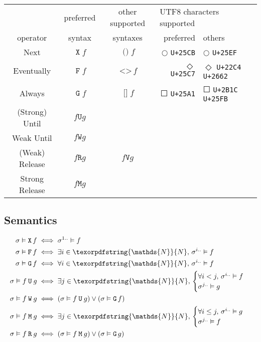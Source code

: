 \documentclass[a4paper,twoside,10pt,DIV=12]{scrreprt}
\newcommand{\uni}[1]{\texttt{\small U+#1}}
\newcommand{\N}{\texorpdfstring{\ensuremath{\mathds{N}}}{N}}
\DeclareMathOperator{\F}{\texttt{F}}
\DeclareMathOperator{\FALT}{\texttt{<>}}
\DeclareMathOperator{\G}{\texttt{G}}
\DeclareMathOperator{\GALT}{\texttt{[]}}
\newcommand{\U}{\mathbin{\texttt{U}}}
\newcommand{\R}{\mathbin{\texttt{R}}}
\newcommand{\RALT}{\mathbin{\texttt{V}}}
\DeclareMathOperator{\X}{\texttt{X}}
\DeclareMathOperator{\XALT}{\texttt{()}}
\newcommand{\M}{\mathbin{\texttt{M}}}
\newcommand{\W}{\mathbin{\texttt{W}}}
\newcommand{\0}{\texttt{0}}
\newcommand{\1}{\texttt{1}}
\begin{document}
\begin{center}
\begin{tabular}{cccrl}
                 & preferred & \multicolumn{1}{c}{other supported} & \multicolumn{2}{l}{UTF8 characters supported} \\
   operator      & syntax    & \multicolumn{1}{c}{syntaxes} & preferred & others \\
  \cmidrule(r){1-3} \cmidrule(l){4-5}
  Next           & $\X f$    & $\XALT f$ & $\Circle$ \uni{25CB} & $\Circle$ \uni{25EF}\\
  Eventually     & $\F f$    & $\FALT f$ & $\Diamond$ \uni{25C7} & $\Diamond$ \uni{22C4} \uni{2662}\\
  Always         & $\G f$    & $\GALT f$ & $\Square$ \uni{25A1} & $\Square$ \uni{2B1C} \uni{25FB}\\
  (Strong) Until & $f \U g$ \\
  Weak Until     & $f \W g$ \\
  (Weak) Release & $f \R g$  & $f \RALT g$ \\
  Strong Release & $f \M g$ \\
\end{tabular}
\end{center}

\subsection{Semantics}\label{sec:opltl:sem}

\begin{align*}
  \sigma\vDash \X f &\iff \sigma^{1..}\vDash f\\
  \sigma\vDash \F f &\iff \exists i\in \N,\, \sigma^{i..}\vDash f\\
  \sigma\vDash \G f &\iff \forall i\in \N,\, \sigma^{i..}\vDash f\\
  \sigma\vDash f\U g &\iff \exists j\in\N,\,
  \begin{cases}
    \forall i<j,\, \sigma^{i..}\vDash f\\
    \sigma^{j..} \vDash g\\
  \end{cases}\\
  \sigma \vDash f\W g &\iff (\sigma\vDash f\U g)\lor(\sigma\vDash\G f)\\
  \sigma \vDash f\M g &\iff \exists j\in\N,\,
  \begin{cases}
    \forall i\le j,\, \sigma^{i..}\vDash g\\
    \sigma^{j..}\vDash f\\
  \end{cases}\\
  \sigma \vDash f\R g &\iff (\sigma \vDash f\M g)\lor(\sigma\vDash \G g)
\end{align*}
\end{document}

